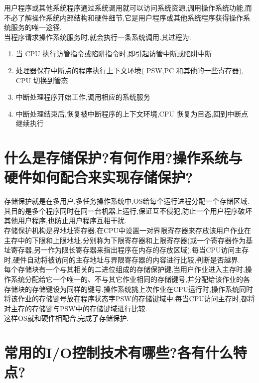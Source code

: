 \documentclass[a4paper,12pt,notitlepage]{article}
\begin{document}
	用户程序或其他系统程序通过系统调用就可以访问系统资源,调用操作系统功能,而不必了解操作系统内部结构和硬件细节,它是用户程序或其他系统程序获得操作系统服务的唯一途径. \\
	
	当程序请求操作系统服务时,就会执行一条系统调用.其过程为: \\
	
\begin{enumerate}
	\item 当 CPU 执行访管指令或陷阱指令时,即引起访管中断或陷阱中断
	\item 处理器保存中断点的程序执行上下文环境( PSW,PC 和其他的一些寄存器), CPU 切换到管态
	\item 中断处理程序开始工作,调用相应的系统服务
	\item 中断处理结束后,恢复被中断程序的上下文环境,CPU 恢复为目态,回到中断点继续执行
\end{enumerate}

\section{什么是存储保护?有何作用?操作系统与硬件如何配合来实现存储保护?}

	存储保护就是在多用户,多任务操作系统中,OS给每个运行进程分配一个存储区域.其目的是多个程序同时在同一台机器上运行,保证互不侵犯,防止一个用户程序破坏其他用户程序,也防止用户程序互相干扰. \\
	
	存储保护机构是界地址寄存器,在CPU中设置一对界限寄存器来存放该用户作业在主存中的下限和上限地址,分别称为下限寄存器和上限寄存器(或一个寄存器作为基址寄存器,另一作为限长寄存器来指出程序在内存的存放区域).每当CPU访问主存时,硬件自动将被访问的主存地址与界限寄存器的内容进行比较,判断是否越界. \\
	
	每个存储块有一个与其相关的二进位组成的存储保护键,当用户作业进入主存时,操作系统分配给它一个唯一的、不与其它作业相同的存储键号,并分配给该作业的各存储块的存储键设为同样的键号.操作系统挑上次作业在CPU运行时,操作系统同时将该作业的存储键号放在程序状态字PSW的存储键域中.每当CPU访问主存时,都将对主存的存储键与PSW中的存储键域进行比较. \\
	
	这样OS就和硬件相配合,完成了存储保护. \\
	
\section{常用的I/O控制技术有哪些?各有什么特点?}
\end{document}
